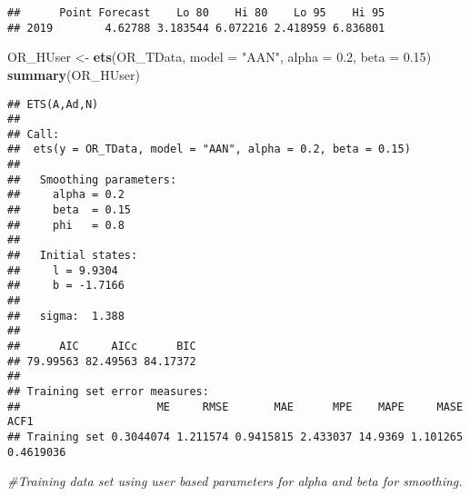 \documentclass[
]{article}
\newenvironment{Shaded}{\begin{snugshade}}{\end{snugshade}}
\newcommand{\CommentTok}[1]{\textcolor[rgb]{0.56,0.35,0.01}{\textit{#1}}}
\newcommand{\DataTypeTok}[1]{\textcolor[rgb]{0.13,0.29,0.53}{#1}}
\newcommand{\DecValTok}[1]{\textcolor[rgb]{0.00,0.00,0.81}{#1}}
\newcommand{\FloatTok}[1]{\textcolor[rgb]{0.00,0.00,0.81}{#1}}
\newcommand{\KeywordTok}[1]{\textcolor[rgb]{0.13,0.29,0.53}{\textbf{#1}}}
\newcommand{\NormalTok}[1]{#1}
\newcommand{\OperatorTok}[1]{\textcolor[rgb]{0.81,0.36,0.00}{\textbf{#1}}}
\newcommand{\StringTok}[1]{\textcolor[rgb]{0.31,0.60,0.02}{#1}}
\begin{document}
\begin{verbatim}
##      Point Forecast    Lo 80    Hi 80    Lo 95    Hi 95
## 2019        4.62788 3.183544 6.072216 2.418959 6.836801
\end{verbatim}

\begin{Shaded}
\end{Shaded}

\begin{Shaded}
\begin{Highlighting}[]
\NormalTok{OR_HUser <-}\StringTok{ }\KeywordTok{ets}\NormalTok{(OR_TData, }\DataTypeTok{model =} \StringTok{"AAN"}\NormalTok{, }\DataTypeTok{alpha =} \FloatTok{0.2}\NormalTok{, }\DataTypeTok{beta =} \FloatTok{0.15}\NormalTok{)}
\KeywordTok{summary}\NormalTok{(OR_HUser)}
\end{Highlighting}
\end{Shaded}

\begin{verbatim}
## ETS(A,Ad,N) 
## 
## Call:
##  ets(y = OR_TData, model = "AAN", alpha = 0.2, beta = 0.15) 
## 
##   Smoothing parameters:
##     alpha = 0.2 
##     beta  = 0.15 
##     phi   = 0.8 
## 
##   Initial states:
##     l = 9.9304 
##     b = -1.7166 
## 
##   sigma:  1.388
## 
##      AIC     AICc      BIC 
## 79.99563 82.49563 84.17372 
## 
## Training set error measures:
##                     ME     RMSE       MAE      MPE    MAPE     MASE      ACF1
## Training set 0.3044074 1.211574 0.9415815 2.433037 14.9369 1.101265 0.4619036
\end{verbatim}

\begin{Shaded}
\begin{Highlighting}[]
\CommentTok{#Training data set using user based parameters for alpha and beta for smoothing.}
\end{Highlighting}
\end{Shaded}
\end{document}
